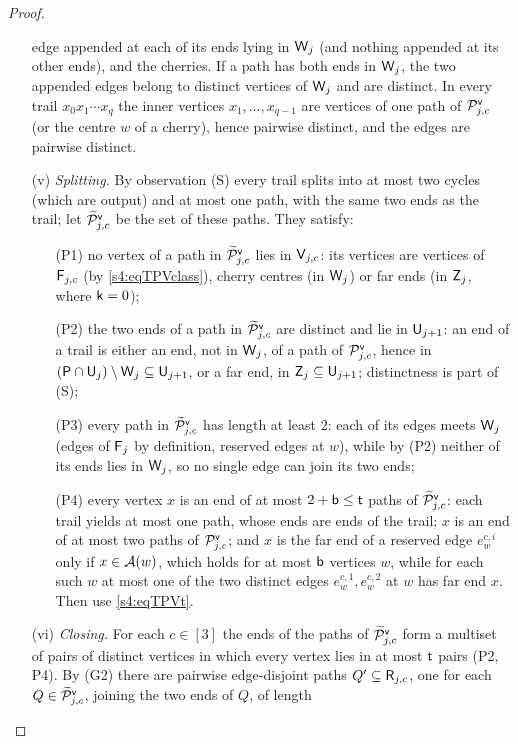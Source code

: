 \begin{proof}
\begin{itemize}
  edge appended at each of its ends lying in $\vW_j$ (and nothing appended at its other ends), and the cherries.
  If a path has both ends in $\vW_j$, the two appended edges belong to distinct vertices of $\vW_j$ and are distinct.
  In every trail $x_0x_1\cdots x_q$ the inner vertices $x_1,\dots,x_{q-1}$ are vertices of one path of
  $\vPaths_{j,c}$ (or the centre $w$ of a cherry), hence pairwise distinct, and the edges are pairwise distinct.
\item[(v)] \emph{Splitting.} By observation \textup{(S)} every trail splits into at most two cycles (which are output)
  and at most one path, with the same two ends as the trail; let $\widetilde{\mathcal{P}}^{\mathsf{v}}_{j,c}$ be the set of these paths. They
  satisfy:
  \begin{itemize}
  \item[(P1)] no vertex of a path in $\widetilde{\mathcal{P}}^{\mathsf{v}}_{j,c}$ lies in $\mathsf{V}_{j,c}$: its vertices are vertices of $\mathsf{F}_{j,c}$
    (by \eqref{s4:eqTPVclass}), cherry centres (in $\vW_j$) or far ends (in $\mathsf{Z}_j$, where $\mathsf{k}=0$);
  \item[(P2)] the two ends of a path in $\widetilde{\mathcal{P}}^{\mathsf{v}}_{j,c}$ are distinct and lie in $\mathsf{U}_{j+1}$: an end of a trail is
    either an end, not in $\vW_j$, of a path of $\vPaths_{j,c}$, hence in $(\mathsf{P}\cap\mathsf{U}_j)\setminus\mathsf{W}_j\subseteq
    \mathsf{U}_{j+1}$, or a far end, in $\mathsf{Z}_j\subseteq\mathsf{U}_{j+1}$; distinctness is part of \textup{(S)};
  \item[(P3)] every path in $\widetilde{\mathcal{P}}^{\mathsf{v}}_{j,c}$ has length at least $2$: each of its edges meets $\vW_j$ (edges of
    $\mathsf{F}_j$ by definition, reserved edges at $w$), while by (P2) neither of its ends lies in $\vW_j$, so no single
    edge can join its two ends;
  \item[(P4)] every vertex $x$ is an end of at most $2+\mathsf{b}\le\mathsf{t}$ paths of $\widetilde{\mathcal{P}}^{\mathsf{v}}_{j,c}$: each trail yields at
    most one path, whose ends are ends of the trail; $x$ is an end of at most two paths of $\vPaths_{j,c}$; and $x$ is
    the far end of a reserved edge $e^{c,i}_w$ only if $x\in \mathcal{A}(w)$, which holds for at most $\mathsf{b}$ vertices $w$, while
    for each such $w$ at most one of the two distinct edges $e^{c,1}_w,e^{c,2}_w$ at $w$ has far end $x$. Then use
    \eqref{s4:eqTPVt}.
  \end{itemize}
\item[(vi)] \emph{Closing.} For each $c\in[3]$ the ends of the paths of $\widetilde{\mathcal{P}}^{\mathsf{v}}_{j,c}$ form a multiset of pairs of
  distinct vertices in which every vertex lies in at most $\mathsf{t}$ pairs (P2, P4). By (G2) there are pairwise
  edge-disjoint paths $Q'\subseteq\mathsf{R}_{j,c}$, one for each $Q\in\widetilde{\mathcal{P}}^{\mathsf{v}}_{j,c}$, joining the two ends of $Q$, of length

\end{itemize}
\end{proof}
